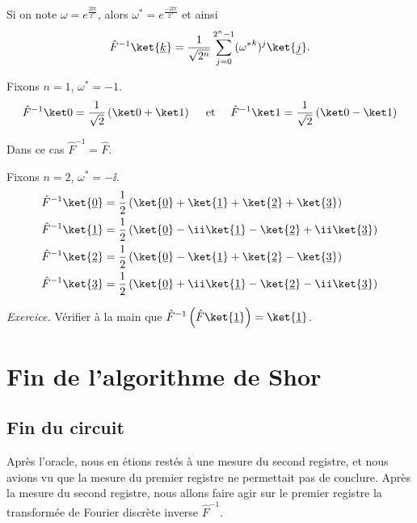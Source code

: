 \documentclass[11pt,class=report,crop=false]{standalone}
\begin{document}
Si on note $\omega = e^{\frac{2\ii\pi}{2^n}}$, alors $\omega^* =  e^{\frac{-2\ii\pi}{2^n}}$
et ainsi
$${\hat F}^{-1} \ket{\underline k} = \frac{1}{\sqrt{2^n}} \sum_{j=0}^{2^n-1} ({\omega^*}^k)^j \ket{\underline j}.$$


\begin{exemple}
Fixons $n=1$, $\omega^* = -1$.
$${\hat F}^{-1} \ket0 = \frac{1}{\sqrt2} \left(\ket0 + \ket1\right) \quad \text{ et } \quad 
{\hat F}^{-1} \ket1 = \frac{1}{\sqrt2} \left(\ket0 - \ket1\right)$$

Dans ce cas ${\hat F}^{-1} = \hat F$.
\end{exemple}

\begin{exemple}
Fixons $n=2$, $\omega^* = -\ii$.
\begin{align*}
{\hat F}^{-1} \ket{\underline0} 
  &= \frac{1}{2} \left(\ket{\underline0} + \ket{\underline1} + \ket{\underline2} + \ket{\underline3}\right) \\
{\hat F}^{-1} \ket{\underline1} 
  &= \frac{1}{2} \left(\ket{\underline0} - \ii\ket{\underline1} - \ket{\underline2} +\ii \ket{\underline3}\right) \\
{\hat F}^{-1} \ket{\underline2} 
  &= \frac{1}{2} \left(\ket{\underline0} - \ket{\underline1} + \ket{\underline2} - \ket{\underline3}\right) \\
{\hat F}^{-1} \ket{\underline3} 
  &= \frac{1}{2} \left(\ket{\underline0} +\ii \ket{\underline1} - \ket{\underline2} -\ii \ket{\underline3}\right) \\
\end{align*}

\emph{Exercice.} Vérifier à la main que 
${\hat F}^{-1} \left( \hat F \ket{\underline1}  \right) = \ket{\underline1}$.
\end{exemple}



\section{Fin de l'algorithme de Shor}

\subsection{Fin du circuit}

Après l'oracle, nous en étions restés à une mesure du second registre, et nous avions vu que la mesure du premier registre ne permettait pas de conclure. 
Après la mesure du second registre, nous allons faire agir sur le premier registre la transformée de Fourier discrète inverse ${\hat F}^{-1}$. 
\end{document}
